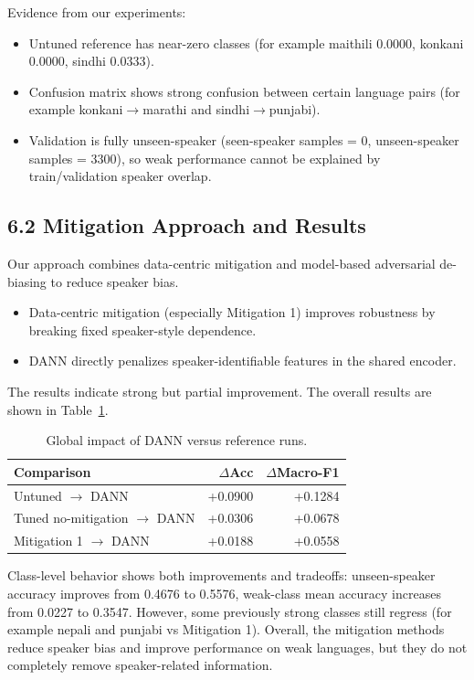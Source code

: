 \documentclass[11pt]{article}
\begin{document}
Evidence from our experiments:
\begin{itemize}
    \item Untuned reference has near-zero classes (for example maithili 0.0000, konkani 0.0000, sindhi 0.0333).
    \item Confusion matrix shows strong confusion between certain language pairs (for example konkani$\rightarrow$marathi and sindhi$\rightarrow$punjabi).
    \item Validation is fully unseen-speaker (seen-speaker samples = 0, unseen-speaker samples = 3300), so weak performance cannot be explained by train/validation speaker overlap.
\end{itemize}


\subsection*{6.2 Mitigation Approach and Results}
Our approach combines data-centric mitigation and model-based adversarial de-biasing to reduce speaker bias. 
\begin{itemize}
    \item Data-centric mitigation (especially Mitigation 1) improves robustness by breaking fixed speaker-style dependence.
    \item DANN directly penalizes speaker-identifiable features in the shared encoder.
\end{itemize}

The results indicate strong but partial improvement. The overall results are shown in Table~\ref{tab:dann_impact}.

\begin{table}[h]
\centering
\small
\setlength{\tabcolsep}{4pt}
\begin{tabular}{@{}lrr@{}}
\toprule
Comparison & $\Delta$Acc & $\Delta$Macro-F1 \\
\midrule
Untuned $\rightarrow$ DANN & +0.0900 & +0.1284 \\
Tuned no-mitigation $\rightarrow$ DANN & +0.0306 & +0.0678 \\
Mitigation 1 $\rightarrow$ DANN & +0.0188 & +0.0558 \\
\bottomrule
\end{tabular}
\caption{Global impact of DANN versus reference runs.}
\label{tab:dann_impact}
\end{table}

Class-level behavior shows both improvements and tradeoffs: unseen-speaker accuracy improves from 0.4676 to 0.5576, weak-class mean accuracy increases from 0.0227 to 0.3547. However, some previously strong classes still regress (for example nepali and punjabi vs Mitigation 1).
Overall, the mitigation methods reduce speaker bias and improve performance on weak languages, but they do not completely remove speaker-related information.
\end{document}
